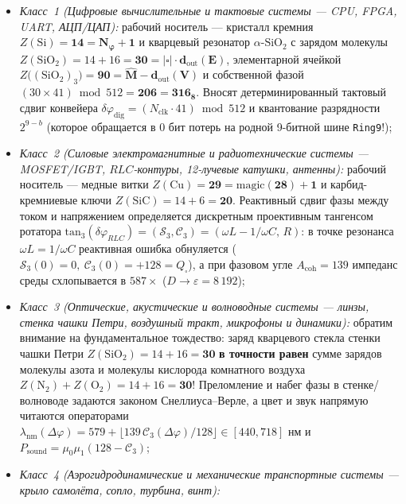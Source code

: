 \begin{enumerate}[label=\textbf{\arabic*.},leftmargin=*]
  \begin{itemize}[noitemsep]
  \item \emph{Класс~1 (Цифровые вычислительные и тактовые системы --- CPU, FPGA, UART, АЦП/ЦАП):}
    рабочий носитель --- кристалл кремния $Z(\mathrm{Si}) = \mathbf{14 = N_\varphi + 1}$ и кварцевый резонатор $\alpha$-$\mathrm{SiO_2}$ с зарядом молекулы $Z(\mathrm{SiO_2}) = 14 + 16 = \mathbf{30 = |\square|\cdot d_{\mathrm{out}}(E)}$, элементарной ячейкой $Z\bigl((\mathrm{SiO_2})_3\bigr) = \mathbf{90 = \hat{M} - d_{\mathrm{out}}(V)}$ и собственной фазой $(30\times 41)\bmod 512 = \mathbf{206 = 316_8}$. Вносят детерминированный тактовый сдвиг конвейера $\delta\varphi_{\mathrm{dig}} = (N_{\mathrm{clk}}\cdot 41)\bmod 512$ и квантование разрядности $2^{9-b}$ (которое обращается в $0\text{ бит}$ потерь на родной 9-битной шине \texttt{Ring9}!);
  \item \emph{Класс~2 (Силовые электромагнитные и радиотехнические системы --- MOSFET/IGBT, $RLC$-контуры, 12-лучевые катушки, антенны):}
    рабочий носитель --- медные витки $Z(\mathrm{Cu}) = \mathbf{29 = \mathrm{magic}(28) + 1}$ и карбид-кремниевые ключи $Z(\mathrm{SiC}) = 14 + 6 = \mathbf{20}$. Реактивный сдвиг фазы между током и напряжением определяется дискретным проективным тангенсом ротатора $\mathrm{tan}_3(\delta\varphi_{RLC}) = (\mathcal{S}_3,\mathcal{C}_3) = (\omega L - 1/\omega C,\,R)$: в точке резонанса $\omega L = 1/\omega C$ реактивная ошибка обнуляется ($\mathcal{S}_3(0) = 0,\ \mathcal{C}_3(0) = +128 = Q_\square$), а при фазовом угле $A_{\mathrm{coh}} = 139$ импеданс среды схлопывается в $587\times$ ($D\to\varepsilon = 8\,192$);
  \item \emph{Класс~3 (Оптические, акустические и волноводные системы --- линзы, стенка чашки Петри, воздушный тракт, микрофоны и динамики):}
    обратим внимание на фундаментальное тождество: заряд кварцевого стекла стенки чашки Петри $Z(\mathrm{SiO_2}) = 14 + 16 = \mathbf{30}$ \textbf{в точности равен} сумме зарядов молекулы азота и молекулы кислорода комнатного воздуха $Z(\mathrm{N_2}) + Z(\mathrm{O_2}) = 14 + 16 = \mathbf{30}$! Преломление и набег фазы в стенке/волноводе задаются законом Снеллиуса--Верле, а цвет и звук напрямую читаются операторами $\lambda_{\mathrm{nm}}(\Delta\varphi) = 579 + \lfloor 139\,\mathcal{C}_3(\Delta\varphi)/128\rfloor\in[440,718]\text{ нм}$ и $P_{\mathrm{sound}} = \mu_0\mu_1(128 - \mathcal{C}_3)$;
  \item \emph{Класс~4 (Аэрогидродинамические и механические транспортные системы --- крыло самолёта, сопло, турбина, винт):}

\end{itemize}
\end{enumerate}
